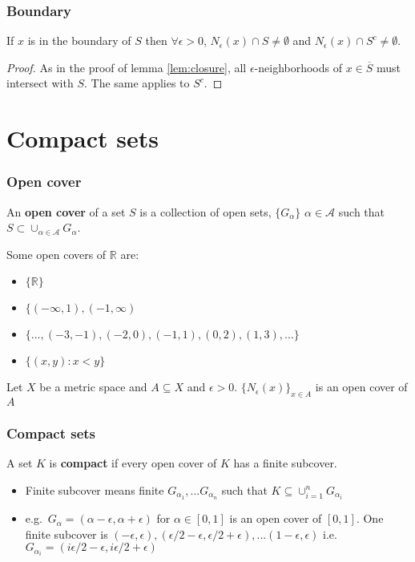 \documentclass[compress]{beamer}
\def\R{\mathbb{R}}
\begin{document}
\begin{frame}
  \frametitle{Boundary}
  \begin{lemma}
    If $x$ is in the boundary of $S$ then $\forall \epsilon>0$,
    $N_\epsilon(x) \cap S \neq \emptyset$ and $N_\epsilon(x) \cap S^c
    \neq \emptyset$. 
  \end{lemma}
  \begin{proof}
    As in the proof of lemma \ref{lem:closure}, all
    $\epsilon$-neighborhoods of $x \in \overline{S}$ must intersect with
    $S$. The same applies to $S^c$. 
  \end{proof}
\end{frame}

\section{Compact sets}

\begin{frame}
  \frametitle{Open cover}
  \begin{definition}
    An \textbf{open cover} of a set $S$ is a collection of open sets,
    $\{G_\alpha\}$  $\alpha \in \mathcal{A}$ such that $S \subset
    \cup_{\alpha \in \mathcal{A}} G_\alpha$. 
  \end{definition}
  \begin{example}
    Some open covers of $\R$ are:
    \begin{itemize}
    \item $\{\R\}$ 
    \item $\{(-\infty, 1), (-1, \infty)$
    \item $\{..., (-3, -1), (-2, 0),(-1,1), (0,2), (1,3), ... \}$
    \item $\{(x,y) : x<y \}$
    \end{itemize}
  \end{example}
  \begin{example}
    Let $X$ be a metric space and $A \subseteq X$ and $\epsilon>0$. 
    $\{N_\epsilon(x)\}_{x \in A}$ is an open cover of $A$
  \end{example}  
\end{frame}

\begin{frame}
  \frametitle{Compact sets}
  \begin{definition}
    A set $K$ is \textbf{compact} if every open cover of $K$ has a
    finite subcover. 
  \end{definition}
  \begin{itemize}
  \item Finite subcover means finite $G_{\alpha_1}, ... G_{\alpha_n}$
    such that $K \subseteq \cup_{i=1}^n G_{\alpha_i}$
  \item e.g.\ $G_{\alpha} = (\alpha-\epsilon,\alpha+\epsilon)$ for
    $\alpha \in [0,1]$ is an open cover of $[0,1]$. One finite subcover
    is $(-\epsilon,\epsilon),(\epsilon/2-\epsilon,\epsilon/2+\epsilon)
    , ... (1-\epsilon,\epsilon)$ i.e. $G_{\alpha_i} = (i\epsilon/2 -
    \epsilon, i\epsilon/2 + \epsilon)$
  \end{itemize}
\end{frame}
\end{document}
